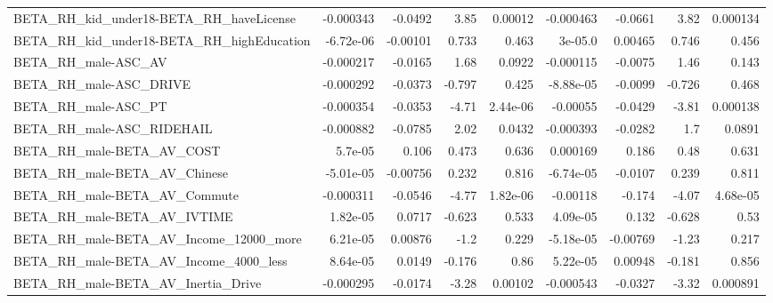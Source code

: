 \begin{tabular}{lrrrrrrrr}
BETA\_RH\_kid\_under18-BETA\_RH\_haveLicense            &   -0.000343 &      -0.0492 &     3.85 &  0.00012 &  -0.000463 &     -0.0661 &         3.82 &      0.000134 \\
BETA\_RH\_kid\_under18-BETA\_RH\_highEducation          &   -6.72e-06 &     -0.00101 &    0.733 &    0.463 &    3e-05.0 &     0.00465 &        0.746 &         0.456 \\
BETA\_RH\_male-ASC\_AV                                &   -0.000217 &      -0.0165 &     1.68 &   0.0922 &  -0.000115 &     -0.0075 &         1.46 &         0.143 \\
BETA\_RH\_male-ASC\_DRIVE                             &   -0.000292 &      -0.0373 &   -0.797 &    0.425 &  -8.88e-05 &     -0.0099 &       -0.726 &         0.468 \\
BETA\_RH\_male-ASC\_PT                                &   -0.000354 &      -0.0353 &    -4.71 & 2.44e-06 &   -0.00055 &     -0.0429 &        -3.81 &      0.000138 \\
BETA\_RH\_male-ASC\_RIDEHAIL                          &   -0.000882 &      -0.0785 &     2.02 &   0.0432 &  -0.000393 &     -0.0282 &          1.7 &        0.0891 \\
BETA\_RH\_male-BETA\_AV\_COST                          &     5.7e-05 &        0.106 &    0.473 &    0.636 &   0.000169 &       0.186 &         0.48 &         0.631 \\
BETA\_RH\_male-BETA\_AV\_Chinese                       &   -5.01e-05 &     -0.00756 &    0.232 &    0.816 &  -6.74e-05 &     -0.0107 &        0.239 &         0.811 \\
BETA\_RH\_male-BETA\_AV\_Commute                       &   -0.000311 &      -0.0546 &    -4.77 & 1.82e-06 &   -0.00118 &      -0.174 &        -4.07 &      4.68e-05 \\
BETA\_RH\_male-BETA\_AV\_IVTIME                        &    1.82e-05 &       0.0717 &   -0.623 &    0.533 &   4.09e-05 &       0.132 &       -0.628 &          0.53 \\
BETA\_RH\_male-BETA\_AV\_Income\_12000\_more             &    6.21e-05 &      0.00876 &     -1.2 &    0.229 &  -5.18e-05 &    -0.00769 &        -1.23 &         0.217 \\
BETA\_RH\_male-BETA\_AV\_Income\_4000\_less              &    8.64e-05 &       0.0149 &   -0.176 &     0.86 &   5.22e-05 &     0.00948 &       -0.181 &         0.856 \\
BETA\_RH\_male-BETA\_AV\_Inertia\_Drive                 &   -0.000295 &      -0.0174 &    -3.28 &  0.00102 &  -0.000543 &     -0.0327 &        -3.32 &      0.000891 \\

\end{tabular}
